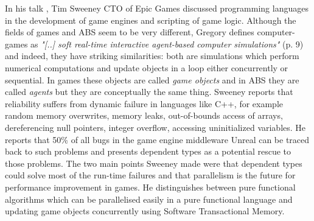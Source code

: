 In his talk \cite{sweeney_next_2006}, Tim Sweeney CTO of Epic Games discussed programming languages in the development of game engines and scripting of game logic. Although the fields of games and ABS seem to be very different, Gregory \cite{gregory_game_2018} defines computer-games as \textit{"[..] soft real-time interactive agent-based computer simulations"} (p. 9) and indeed, they have striking similarities: both are simulations which perform numerical computations and update objects in a loop either concurrently or sequential. In games these objects are called \textit{game objects} and in ABS they are called \textit{agents} but they are conceptually the same thing.  Sweeney reports that reliability suffers from dynamic failure in languages like C++, for example random memory overwrites, memory leaks, out-of-bounds access of arrays, dereferencing null pointers, integer overflow, accessing uninitialized variables. He reports that 50\% of all bugs in the game engine middleware Unreal can be traced back to such problems and presents dependent types as a potential rescue to those problems. The two main points Sweeney made were that dependent types could solve most of the run-time failures and that parallelism is the future for performance improvement in games. He distinguishes between pure functional algorithms which can be parallelised easily in a pure functional language and updating game objects concurrently using Software Transactional Memory.